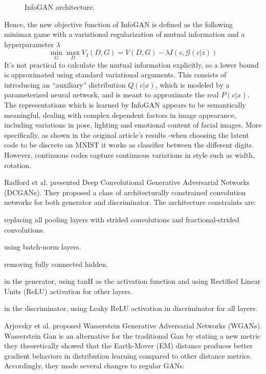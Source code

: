 \documentclass[letterpaper,12pt]{article}
\begin{document}
\begin{description}
\begin{figure}[H]
\caption{\label{figure 3 }InfoGAN architecture.}
\end{figure}
Hence, the new objective function of InfoGAN is defined as the following minimax game with a variational regularization of mutual information and a hyperparameter \(\lambda\)
\begin{equation} \label{eq:ganeq2} %
\min _G \max _D V_I(D,G)= V(D,G) -  \lambda I(c,\mathcal{G}(c|z))
\end{equation}
It’s not practical to calculate the mutual information explicitly, so a lower bound is approximated using standard variational arguments.  This consists of introducing an “auxiliary” distribution \(Q(c|x)\), which is modeled by a parameterized neural network, and is meant to approximate the real \(P(c|x)\). 
The representations which is learned by InfoGAN appears to be semantically meaningful, dealing with complex dependent factors in image appearance, including variations in pose, lighting and emotional content of facial images.
More specifically, as shown in the original article's results -when choosing the latent code to be discrete on MNIST it works as classifier between the different digits. However, continuous codes capture continuous variations in style such as width, rotation.
\item[DCGAN] Radford et al.\cite{RadfordMC15} presented Deep Convolutional Generative Adversarial Networks (DCGANs). They proposed a class of architecturally constrained convolution networks for both generator and discriminator. 
The architecture constraints are:
\begin{enumerate*}[label={\roman*)},font={\color{red!50!black}\bfseries}]
\item replacing all pooling layers with strided convolutions and fractional-strided convolutions.
\item using batch-norm layers.
\item removing fully connected hidden.
\item in the generator, using tanH as the activation function and using Rectified Linear Units (ReLU) activation for other layers.
\item in the discriminator, using Leaky ReLU activation in discriminator for all layers.
\end{enumerate*}
\item[WGAN] Arjovsky et al.\cite{pmlr-v70-arjovsky17a} proposed Wasserstein Generative Adversarial Networks (WGANs). Wasserstein Gan is an alternative for the traditional Gan by stating a new metric they theoretically showed that the Earth-Mover (EM) distance produces better gradient behaviors in distribution learning compared to other distance metrics. Accordingly, they made several changes to regular GANs:

\end{description}
\end{document}
